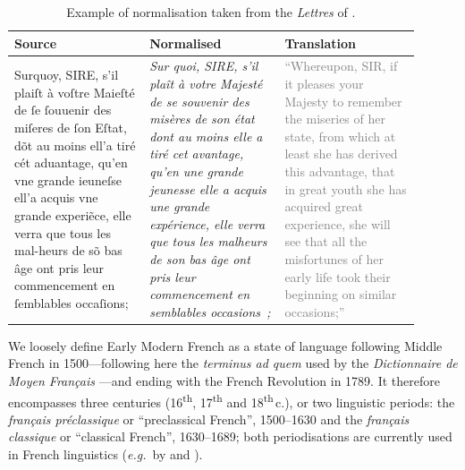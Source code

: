 \begin{table}[!htp]
    \centering\small
    \begin{tabular}{@{}p{0.3\linewidth}p{0.3\linewidth}p{0.3\linewidth}@{}}
        \toprule
        Source                                                                                                                                                                                                                                                                                               & Normalised & Translation \\
        \midrule
        Surquoy, SIRE, s’il plaiſt à voſtre Maieſté de ſe ſouuenir des miſeres de ſon Eſtat, dõt au moins ell’a tiré cét aduantage, qu’en vne grande ieuneſse ell’a acquis vne grande experi\~ece, elle verra que tous les mal-heurs de sõ bas âge ont pris leur commencement en ſemblables occaſions;       &
        \emph{Sur quoi, SIRE, s’il plaît à votre Majesté de se souvenir des misères de son état dont au moins elle a tiré cet avantage, qu’en une grande jeunesse elle a acquis une grande expérience, elle verra que tous les malheurs de son bas âge ont pris leur commencement en semblables occasions~;} &
        \textcolor{gray}{``Whereupon, SIR, if it pleases your Majesty to remember the miseries of her state, from which at least she has derived this advantage, that in great youth she has acquired great experience, she will see that all the misfortunes of her early life took their beginning on similar occasions;''}           \\
        \bottomrule
    \end{tabular}
    \caption{\label{tab:norm_examples}Example of normalisation taken from the \emph{Lettres} of \protect{}.}
\end{table}

We loosely define Early Modern French as a state of language following Middle French in 1500---following here the \emph{terminus ad quem} used by the \emph{Dictionnaire de Moyen Français} \cite{martin-2020-dictionnaire}---and ending with the French Revolution in 1789. It therefore encompasses three centuries (16\textsuperscript{th}, 17\textsuperscript{th} and 18\textsuperscript{th}\,c.), or two linguistic periods: the \emph{français préclassique} or ``preclassical French'', 1500--1630 and the \emph{français classique} or ``classical French'', 1630--1689; both periodisations are currently used in French linguistics (\emph{e.g.}~by  and ).

